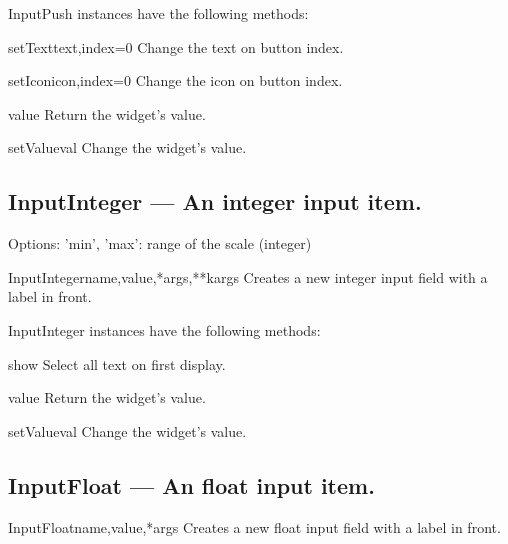 InputPush instances have the following methods:

\begin{funcdesc}{setText}{text,index=0}
Change the text on button index.
\end{funcdesc}

\begin{funcdesc}{setIcon}{icon,index=0}
Change the icon on button index.
\end{funcdesc}

\begin{funcdesc}{value}{}
Return the widget's value.
\end{funcdesc}

\begin{funcdesc}{setValue}{val}
Change the widget's value.
\end{funcdesc}

\subsection{InputInteger --- An integer input item.}
    Options:
    'min', 'max': range of the scale (integer)
    

\begin{classdesc}{InputInteger}{name,value,*args,**kargs}
Creates a new integer input field with a label in front.
\end{classdesc}

InputInteger instances have the following methods:

\begin{funcdesc}{show}{}
Select all text on first display.
\end{funcdesc}

\begin{funcdesc}{value}{}
Return the widget's value.
\end{funcdesc}

\begin{funcdesc}{setValue}{val}
Change the widget's value.
\end{funcdesc}

\subsection{InputFloat --- An float input item.}


\begin{classdesc}{InputFloat}{name,value,*args}
Creates a new float input field with a label in front.
\end{classdesc}

